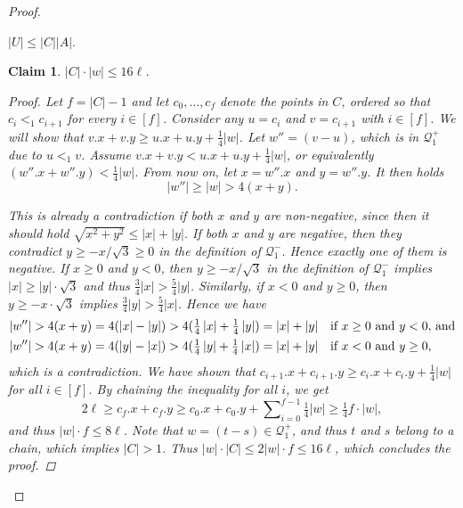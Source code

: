 \documentclass[twoside,leqno]{article}
\newtheorem{claim}{Claim}[section]
\newcommand{\Q}{\mathcal{Q}}
\newcommand{\absolute}[1]{\left\lvert#1\right\rvert}
\begin{document}
\begin{proof}
\begin{fact}\label{dilworth}
	$\absolute{U} \le \absolute{C} \absolute{A}$.
\end{fact}

\begin{claim}\label{C_ineq}
	$\absolute{C} \cdot \absolute{w} \leq 16\ell$. 
	\begin{proof}
		Let $f = \absolute{C} - 1$ and
		let $c_0, \dots, c_{f}$ denote the points in $C$, ordered so that $c_i <_1 c_{i + 1}$ for every $i \in [f]$.
		Consider any $u = c_i$ and $v = c_{i + 1}$ with $i \in [f]$. We will show that $v.x + v.y \geq u.x + u.y + \frac14\absolute{w}$. 		
		Let $w'' = (v - u)$, which is in $\Q_1^+$ due to $u <_1 v$. Assume $v.x + v.y < u.x + u.y + \frac14\absolute{w}$, or equivalently $(w''.x + w''.y) < \frac14\absolute{w}$. From now on, let $x = w''.x$ and $y = w''.y$. It then holds $$\absolute{w''} \geq \absolute{w} > 4(x + y).$$
		
		This is already a contradiction if both $x$ and $y$ are non-negative, since then it should hold $\sqrt{x^2 + y^2} \leq \absolute{x} + \absolute{y}$. If both $x$ and $y$ are negative, then they contradict $y \geq -x/\sqrt{3} \geq 0$ in the definition of $\Q_1^-$. Hence exactly one of them is negative. If $x \geq 0$ and $y < 0$, then $y \geq -x / \sqrt{3}$ in the definition of $\Q_1^-$ implies $\absolute{x} \geq \absolute{y}\cdot \sqrt{3}$ and thus $\frac34\absolute{x} > \frac54\absolute{y}$. Similarly, if $x < 0$ and $y \geq 0$, then $y \geq -x \cdot \sqrt{3}$ implies $\frac34\absolute{y} > \frac54\absolute{x}$. Hence we have
	\begin{alignat*}{1}	
		\absolute{w''} > 4(x + y) = 
		4(\absolute{x} - \absolute{y}) > 
		4(\tfrac14\absolute{x} + \tfrac14\absolute{y}) = 
		\absolute{x} + \absolute{y}&\text{\quad if $x \geq 0$ and $y < 0$, and}\\
		\absolute{w''} > 4(x + y) = 
		4(\absolute{y} - \absolute{x}) > 
		4(\tfrac14\absolute{y} + \tfrac14\absolute{x}) = 
		\absolute{x} + \absolute{y}&\text{\quad if $x < 0$ and $y \geq 0$,}
	\end{alignat*}
	which is a contradiction.
	We have shown that $c_{i + 1}.x + c_{i + 1}.y \geq c_i.x + c_i.y + \frac14\absolute{w}$ for all $i \in [f]$. By chaining the inequality for all $i$, we get $$2\ell \geq c_f.x + c_f.y \geq c_0.x + c_0.y + \sum\nolimits_{i = 0}^{f - 1} \tfrac14\absolute{w} \geq \tfrac14f\cdot{\absolute{w}},$$ and thus $\absolute{w} \cdot f \leq 8\ell$. Note that $w = (t - s) \in \Q_1^+$, and thus $t$ and $s$ belong to a chain, which implies $\absolute{C} > 1$. Thus $\absolute{w} \cdot \absolute{C} \leq 2\absolute{w} \cdot f \leq 16\ell$, which concludes the proof.
	\end{proof}%
\end{claim}


\end{proof}
\end{document}
